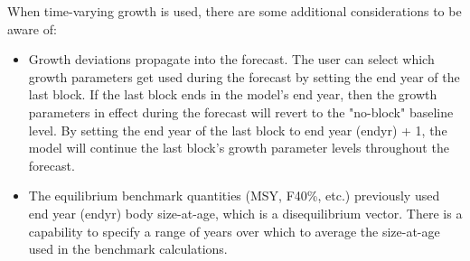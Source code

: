 When time-varying growth is used, there are some additional considerations to be aware of:
\begin{itemize}
	\item Growth deviations propagate into the forecast. The user can select which growth parameters get used during the forecast by setting the end year of the last block. If the last block ends in the model's end year, then the growth parameters in effect during the forecast will revert to the "no-block" baseline level.  By setting the end year of the last block to end year (endyr) + 1, the model will continue the last block's growth parameter levels throughout the forecast.
	\item The equilibrium benchmark quantities (MSY, F40\%, etc.) previously used end year (endyr) body size-at-age, which is a disequilibrium vector. There is a capability to specify a range of years over which to average the size-at-age used in the benchmark calculations.
\end{itemize}


